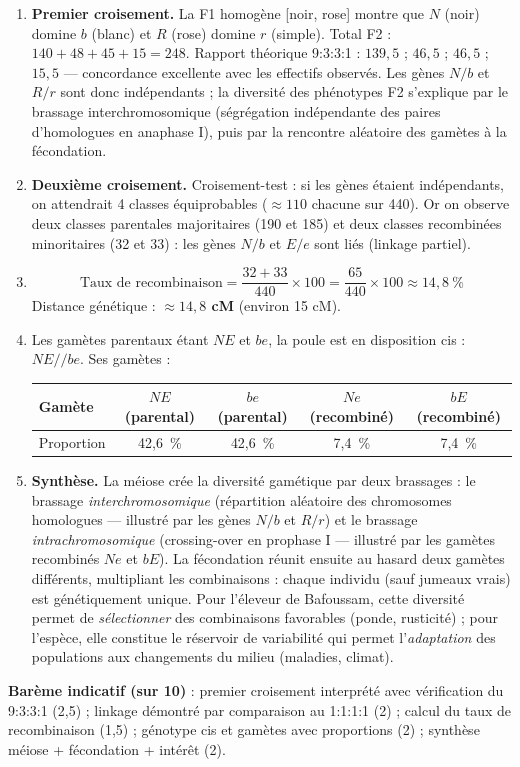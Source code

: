 \documentclass[11pt]{article}
\newcommand{\cle}[1]{{\popxbold\color{popdark}#1}}
\begin{document}
\begin{corrige}
\begin{enumerate}
\item \textbf{Premier croisement.} La F1 homogène [noir, rose] montre que $N$ (noir) domine $b$ (blanc) et $R$ (rose) domine $r$ (simple). Total F2 : $140+48+45+15 = 248$. Rapport théorique 9:3:3:1 : $139{,}5$ ; $46{,}5$ ; $46{,}5$ ; $15{,}5$ — concordance excellente avec les effectifs observés. Les gènes $N/b$ et $R/r$ sont donc \cle{indépendants} ; la diversité des phénotypes F2 s'explique par le \cle{brassage interchromosomique} (ségrégation indépendante des paires d'homologues en anaphase I), puis par la rencontre aléatoire des gamètes à la fécondation.
\item \textbf{Deuxième croisement.} Croisement-test : si les gènes étaient indépendants, on attendrait 4 classes équiprobables ($\approx 110$ chacune sur 440). Or on observe deux classes parentales majoritaires (190 et 185) et deux classes recombinées minoritaires (32 et 33) : les gènes $N/b$ et $E/e$ sont \cle{liés} (linkage partiel).
\item 
\[ \text{Taux de recombinaison} = \frac{32 + 33}{440} \times 100 = \frac{65}{440} \times 100 \approx 14{,}8~\% \]
Distance génétique : \textbf{$\approx 14{,}8$ cM} (environ 15 cM).
\item Les gamètes parentaux étant $NE$ et $be$, la poule est en disposition \cle{cis} : $NE//be$. Ses gamètes :
\begin{center}
\begin{tabular}{|l|c|c|c|c|}
\hline
\rowcolor{popblueL} Gamète & $NE$ (parental) & $be$ (parental) & $Ne$ (recombiné) & $bE$ (recombiné) \\
\hline
Proportion & 42,6~\% & 42,6~\% & 7,4~\% & 7,4~\% \\
\hline
\end{tabular}
\end{center}
\item \textbf{Synthèse.} La méiose crée la diversité gamétique par deux brassages : le brassage \emph{interchromosomique} (répartition aléatoire des chromosomes homologues — illustré par les gènes $N/b$ et $R/r$) et le brassage \emph{intrachromosomique} (crossing-over en prophase I — illustré par les gamètes recombinés $Ne$ et $bE$). La fécondation réunit ensuite au hasard deux gamètes différents, multipliant les combinaisons : chaque individu (sauf jumeaux vrais) est génétiquement unique. Pour l'éleveur de Bafoussam, cette diversité permet de \emph{sélectionner} des combinaisons favorables (ponde, rusticité) ; pour l'espèce, elle constitue le réservoir de variabilité qui permet l'\emph{adaptation} des populations aux changements du milieu (maladies, climat).
\end{enumerate}
\textbf{Barème indicatif (sur 10)} : premier croisement interprété avec vérification du 9:3:3:1 (2,5) ; linkage démontré par comparaison au 1:1:1:1 (2) ; calcul du taux de recombinaison (1,5) ; génotype cis et gamètes avec proportions (2) ; synthèse méiose + fécondation + intérêt (2).


\end{corrige}
\end{document}
